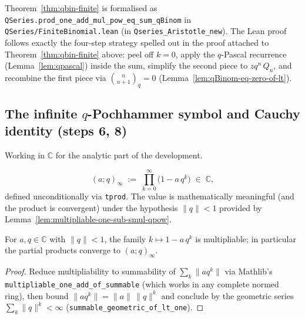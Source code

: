 Theorem~\ref{thm:qbin-finite} is formalised as
\texttt{QSeries.prod\_one\_add\_mul\_pow\_eq\_sum\_qBinom} in \texttt{QSeries/FiniteBinomial.lean}
(in \texttt{Qseries\_Aristotle\_new}).
The Lean proof follows exactly the four-step strategy spelled out in
the proof attached to Theorem~\ref{thm:qbin-finite} above:
peel off $k = 0$, apply the $q$-Pascal recurrence
(Lemma~\ref{lem:qpascal}) inside the sum, simplify the second piece
to $z q^n\, Q_n$, and recombine the first piece via
$\binom{n}{n+1}_q = 0$ (Lemma~\ref{lem:qBinom-eq-zero-of-lt}).

\subsection{The infinite $q$-Pochhammer symbol and Cauchy identity (steps 6, 8)}\label{subsec:qbin-infinite-formalized}

Working in $\mathbb{C}$ for the analytic part of the development.

\begin{definition}\label{def:qPochhammerInf}\leanok
\[
  (a; q)_\infty \;:=\; \prod_{k=0}^{\infty}\bigl(1 - a\, q^k\bigr) \;\in\; \mathbb{C},
\]
defined unconditionally via \texttt{tprod}. The value is mathematically
meaningful (and the product is convergent) under the hypothesis $\|q\| < 1$
provided by Lemma~\ref{lem:multipliable-one-sub-smul-qpow}.
\end{definition}

\begin{lemma}[Multipliability]\label{lem:multipliable-one-sub-smul-qpow}\leanok{}
For $a, q \in \mathbb{C}$ with $\|q\| < 1$, the family
$k \mapsto 1 - a\, q^k$ is multipliable; in particular the partial
products converge to $(a; q)_\infty$.
\end{lemma}

\begin{proof}\leanok
Reduce multipliability to summability of $\sum_k \|a q^k\|$ via Mathlib's
\texttt{multipliable\_one\_add\_of\_summable} (which works in any complete
normed ring), then bound $\|a q^k\| = \|a\|\, \|q\|^k$ and conclude by the
geometric series $\sum_k \|q\|^k < \infty$
(\texttt{summable\_geometric\_of\_lt\_one}).
\end{proof}

